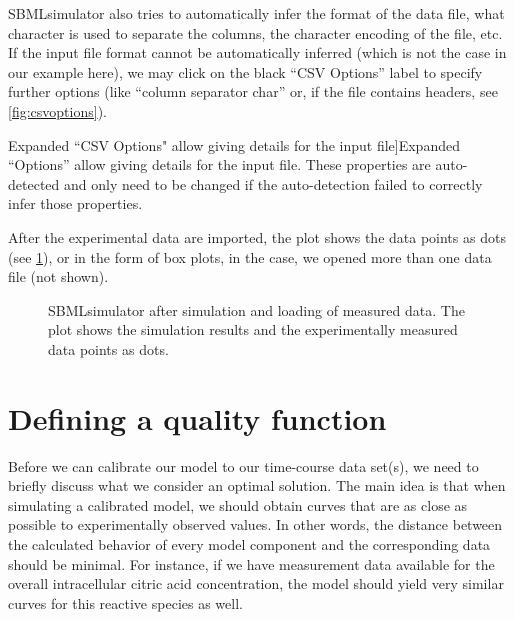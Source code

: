 SBMLsimulator also tries to automatically infer the format of the data file, \eg what character is used to separate the columns, the character encoding of the file, etc.
If the input file format cannot be automatically inferred (which is not the case in our example here), we may click on the black ``CSV Options'' label to specify further options (like ``column separator char'' or, if the file contains headers, see \cref{fig:csvoptions}).
\begin{SCfigure}%
{}
\caption[Expanded ``CSV Options" allow giving details for the input file]{Expanded ``\CSV Options'' allow giving details for the input file.
These properties are auto-detected and only need to be changed if the auto-detection failed to correctly infer those properties.}
\label{fig:csvoptions}
\end{SCfigure}
After the experimental data are imported, the plot shows the data points as dots (see \cref{fig:simulationResultsWithData}), or in the form of box plots, in the case, we opened more than one data file (not shown).
\begin{figure}[t]
\centering
{}
\caption[SBMLsimulator after simulation and loading of measured data]{SBMLsimulator after simulation and loading of measured data.
The plot shows the simulation results and the experimentally measured data points as dots.}
\label{fig:simulationResultsWithData}
\end{figure}

\section{Defining a quality function}
\label{sec:QualityDefinition}

Before we can calibrate our model to our time-course data set(s), we need to briefly discuss what we consider an optimal solution.
The main idea is that when simulating a calibrated model, we should obtain curves that are as close as possible to experimentally observed values.
In other words, the distance between the calculated behavior of every model component and the corresponding data should be minimal.
For instance, if we have measurement data available for the overall intracellular citric acid concentration, the model should yield very similar curves for this reactive species as well.

